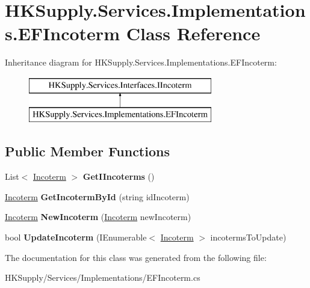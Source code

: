 \hypertarget{class_h_k_supply_1_1_services_1_1_implementations_1_1_e_f_incoterm}{}\section{H\+K\+Supply.\+Services.\+Implementations.\+E\+F\+Incoterm Class Reference}
\label{class_h_k_supply_1_1_services_1_1_implementations_1_1_e_f_incoterm}
Inheritance diagram for H\+K\+Supply.\+Services.\+Implementations.\+E\+F\+Incoterm\+:\begin{figure}[H]
\begin{center}
\leavevmode
\includegraphics[height=2.000000cm]{class_h_k_supply_1_1_services_1_1_implementations_1_1_e_f_incoterm}
\end{center}
\end{figure}
\subsection*{Public Member Functions}
\begin{DoxyCompactItemize}
\item 
\mbox{\label{class_h_k_supply_1_1_services_1_1_implementations_1_1_e_f_incoterm_afea217306f38a85bba4d0e77416b5823}} 
List$<$ \mbox{\hyperlink{class_h_k_supply_1_1_models_1_1_incoterm}{Incoterm}} $>$ {\bfseries Get\+I\+Incoterms} ()
\item 
\mbox{\label{class_h_k_supply_1_1_services_1_1_implementations_1_1_e_f_incoterm_a08462932e1c8b3ca21b5f40e2da0893b}} 
\mbox{\hyperlink{class_h_k_supply_1_1_models_1_1_incoterm}{Incoterm}} {\bfseries Get\+Incoterm\+By\+Id} (string id\+Incoterm)
\item 
\mbox{\label{class_h_k_supply_1_1_services_1_1_implementations_1_1_e_f_incoterm_ad8687c3d4cecfbd89f62213fe4f4d601}} 
\mbox{\hyperlink{class_h_k_supply_1_1_models_1_1_incoterm}{Incoterm}} {\bfseries New\+Incoterm} (\mbox{\hyperlink{class_h_k_supply_1_1_models_1_1_incoterm}{Incoterm}} new\+Incoterm)
\item 
\mbox{\label{class_h_k_supply_1_1_services_1_1_implementations_1_1_e_f_incoterm_af5a346e48cfad695150c6094e22243e1}} 
bool {\bfseries Update\+Incoterm} (I\+Enumerable$<$ \mbox{\hyperlink{class_h_k_supply_1_1_models_1_1_incoterm}{Incoterm}} $>$ incoterms\+To\+Update)
\end{DoxyCompactItemize}


The documentation for this class was generated from the following file\+:\begin{DoxyCompactItemize}
\item 
H\+K\+Supply/\+Services/\+Implementations/E\+F\+Incoterm.\+cs\end{DoxyCompactItemize}
